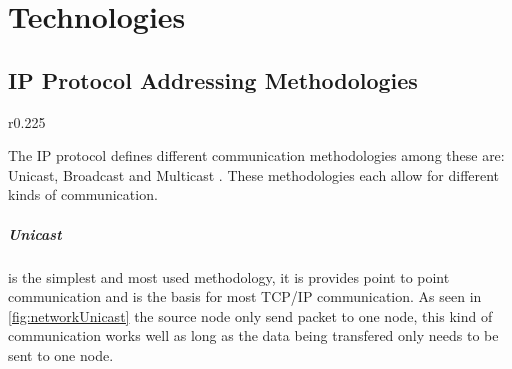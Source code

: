 \chapter{Technologies}

\section{IP Protocol Addressing Methodologies}

\begin{wrapfigure}{r}{0.225\textwidth}
		\vspace{-20pt}
		
		\vspace{-10pt}
\end{wrapfigure}

The IP protocol defines different communication methodologies among these are: Unicast, Broadcast \cite{RFC0919_Broadcast} and Multicast \cite{RFC1112_Multicast_IGMPv1}.
These methodologies each allow for different kinds of communication.
				
\paragraph{Unicast} is the simplest and most used methodology, it is provides point to point communication and is the basis for most TCP/IP communication.
As seen in \cref{fig:networkUnicast} the source node only send packet to one node, this kind of communication works well as long as the data being transfered only needs to be sent to one node.

